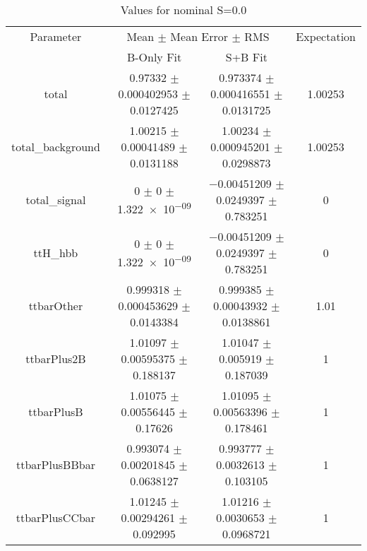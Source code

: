 \begin{table}
\centering
\caption{Values for nominal S=0.0}
\begin{tabular}{cccc}
\toprule
Parameter & \multicolumn{2}{c}{Mean $\pm$ Mean Error $\pm$ RMS} & Expectation\\
 & B-Only Fit & S+B Fit & \\
\midrule
total & \num{0.97332} $\pm$ \num{0.000402953} $\pm$ \num{0.0127425} & \num{0.973374} $\pm$ \num{0.000416551} $\pm$ \num{0.0131725} & \num{1.00253}\\
total\_background & \num{1.00215} $\pm$ \num{0.00041489} $\pm$ \num{0.0131188} & \num{1.00234} $\pm$ \num{0.000945201} $\pm$ \num{0.0298873} & \num{1.00253}\\
total\_signal & \num{0} $\pm$ \num{0} $\pm$ \num{1.322e-09} & \num{-0.00451209} $\pm$ \num{0.0249397} $\pm$ \num{0.783251} & \num{0}\\
ttH\_hbb & \num{0} $\pm$ \num{0} $\pm$ \num{1.322e-09} & \num{-0.00451209} $\pm$ \num{0.0249397} $\pm$ \num{0.783251} & \num{0}\\
ttbarOther & \num{0.999318} $\pm$ \num{0.000453629} $\pm$ \num{0.0143384} & \num{0.999385} $\pm$ \num{0.00043932} $\pm$ \num{0.0138861} & \num{1.01}\\
ttbarPlus2B & \num{1.01097} $\pm$ \num{0.00595375} $\pm$ \num{0.188137} & \num{1.01047} $\pm$ \num{0.005919} $\pm$ \num{0.187039} & \num{1}\\
ttbarPlusB & \num{1.01075} $\pm$ \num{0.00556445} $\pm$ \num{0.17626} & \num{1.01095} $\pm$ \num{0.00563396} $\pm$ \num{0.178461} & \num{1}\\
ttbarPlusBBbar & \num{0.993074} $\pm$ \num{0.00201845} $\pm$ \num{0.0638127} & \num{0.993777} $\pm$ \num{0.0032613} $\pm$ \num{0.103105} & \num{1}\\
ttbarPlusCCbar & \num{1.01245} $\pm$ \num{0.00294261} $\pm$ \num{0.092995} & \num{1.01216} $\pm$ \num{0.0030653} $\pm$ \num{0.0968721} & \num{1}\\
\bottomrule
\end{tabular}
\end{table}